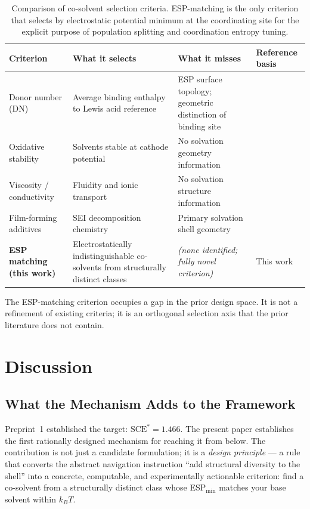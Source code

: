 \documentclass[11pt]{article}
\theoremstyle{plain}
\theoremstyle{definition}
\theoremstyle{remark}
\begin{document}
\begin{table}[h!]
\centering
\caption{Comparison of co-solvent selection criteria.  ESP-matching is
the only criterion that selects by electrostatic potential minimum
at the coordinating site for the explicit purpose of population splitting
and coordination entropy tuning.}
\label{tab:comparison}
\small
\begin{tabular}{p{3.2cm}p{3.5cm}p{3.5cm}p{3cm}}
\toprule
Criterion & What it selects & What it misses & Reference basis \\
\midrule
Donor number (DN) & Average binding enthalpy to Lewis acid reference & ESP surface topology; geometric distinction of binding site & \cite{Gutmann1976} \\[8pt]
Oxidative stability & Solvents stable at cathode potential & No solvation geometry information & \cite{Borodin2020} \\[8pt]
Viscosity / conductivity & Fluidity and ionic transport & No solvation structure information & \cite{Logan2018} \\[8pt]
Film-forming additives & SEI decomposition chemistry & Primary solvation shell geometry & \cite{Aurbach2000} \\[8pt]
\textbf{ESP matching (this work)} & Electrostatically indistinguishable co-solvents from structurally distinct classes & \textit{(none identified; fully novel criterion)} & This work \\
\bottomrule
\end{tabular}
\end{table}

The ESP-matching criterion occupies a gap in the prior design space.
It is not a refinement of existing criteria; it is an orthogonal
selection axis that the prior literature does not contain.

\section{Discussion}

\subsection{What the Mechanism Adds to the Framework}

Preprint~1 established the target: $\mathrm{SCE}^{*} = 1.466$.
The present paper establishes the first rationally designed mechanism
for reaching it from below.  The contribution is not just a candidate
formulation; it is a \emph{design principle} --- a rule that converts the
abstract navigation instruction ``add structural diversity to the shell''
into a concrete, computable, and experimentally actionable criterion:
find a co-solvent from a structurally distinct class whose
ESP$_{\min}$ matches your base solvent within $k_BT$.
\end{document}
